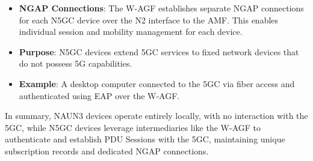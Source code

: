 \begin{itemize}
{\begin{itemize}
{            }
            \item {
                \textbf{\ac{NGAP} Connections}: The \ac{W-AGF} establishes separate \ac{NGAP} connections for each \ac{N5GC} device over the N2 interface to the \ac{AMF}. This enables individual session and mobility management for each device.
            }
            \item {
                \textbf{Purpose}: \ac{N5GC} devices extend \ac{5GC} services to fixed network devices that do not possess \ac{5G} capabilities.
            }
            \item {
                \textbf{Example}: A desktop computer connected to the \ac{5GC} via fiber access and authenticated using \ac{EAP} over the \ac{W-AGF}.
            }
        \end{itemize}    
    }
\end{itemize}

In summary, \ac{NAUN3} devices operate entirely locally, with no interaction with the \ac{5GC}, while \ac{N5GC} devices leverage intermediaries like the \ac{W-AGF} to authenticate and establish \ac{PDU} Sessions with the \ac{5GC}, maintaining unique subscription records and dedicated \ac{NGAP} connections.
